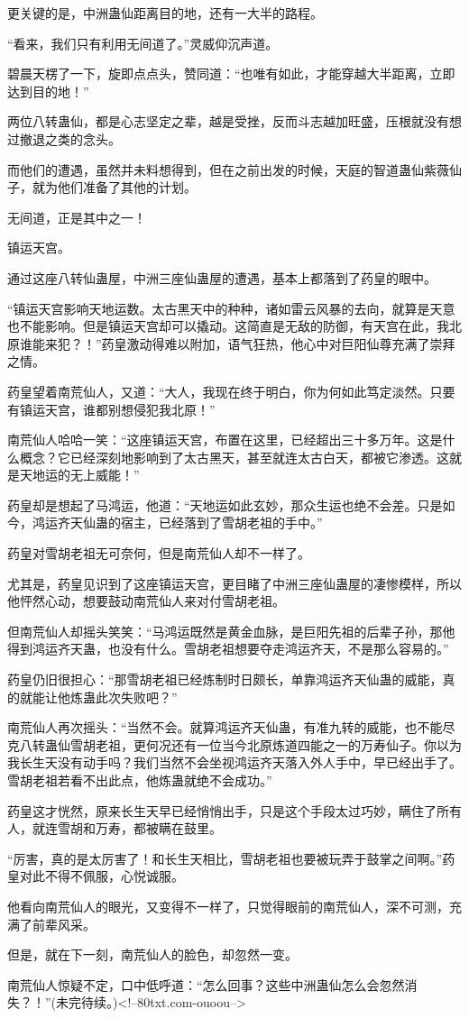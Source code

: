 \begin{this_body}
更关键的是，中洲蛊仙距离目的地，还有一大半的路程。

“看来，我们只有利用无间道了。”灵威仰沉声道。

碧晨天楞了一下，旋即点点头，赞同道：“也唯有如此，才能穿越大半距离，立即达到目的地！”

两位八转蛊仙，都是心志坚定之辈，越是受挫，反而斗志越加旺盛，压根就没有想过撤退之类的念头。

而他们的遭遇，虽然并未料想得到，但在之前出发的时候，天庭的智道蛊仙紫薇仙子，就为他们准备了其他的计划。

无间道，正是其中之一！

镇运天宫。

通过这座八转仙蛊屋，中洲三座仙蛊屋的遭遇，基本上都落到了药皇的眼中。

“镇运天宫影响天地运数。太古黑天中的种种，诸如雷云风暴的去向，就算是天意也不能影响。但是镇运天宫却可以撬动。这简直是无敌的防御，有天宫在此，我北原谁能来犯？！”药皇激动得难以附加，语气狂热，他心中对巨阳仙尊充满了崇拜之情。

药皇望着南荒仙人，又道：“大人，我现在终于明白，你为何如此笃定淡然。只要有镇运天宫，谁都别想侵犯我北原！”

南荒仙人哈哈一笑：“这座镇运天宫，布置在这里，已经超出三十多万年。这是什么概念？它已经深刻地影响到了太古黑天，甚至就连太古白天，都被它渗透。这就是天地运的无上威能！”

药皇却是想起了马鸿运，他道：“天地运如此玄妙，那众生运也绝不会差。只是如今，鸿运齐天仙蛊的宿主，已经落到了雪胡老祖的手中。”

药皇对雪胡老祖无可奈何，但是南荒仙人却不一样了。

尤其是，药皇见识到了这座镇运天宫，更目睹了中洲三座仙蛊屋的凄惨模样，所以他怦然心动，想要鼓动南荒仙人来对付雪胡老祖。

但南荒仙人却摇头笑笑：“马鸿运既然是黄金血脉，是巨阳先祖的后辈子孙，那他得到鸿运齐天蛊，也没有什么。雪胡老祖想要夺走鸿运齐天，不是那么容易的。”

药皇仍旧很担心：“那雪胡老祖已经炼制时日颇长，单靠鸿运齐天仙蛊的威能，真的就能让他炼蛊此次失败吧？”

南荒仙人再次摇头：“当然不会。就算鸿运齐天仙蛊，有准九转的威能，也不能尽克八转蛊仙雪胡老祖，更何况还有一位当今北原炼道四能之一的万寿仙子。你以为我长生天没有动手吗？我们当然不会坐视鸿运齐天落入外人手中，早已经出手了。雪胡老祖若看不出此点，他炼蛊就绝不会成功。”

药皇这才恍然，原来长生天早已经悄悄出手，只是这个手段太过巧妙，瞒住了所有人，就连雪胡和万寿，都被瞒在鼓里。

“厉害，真的是太厉害了！和长生天相比，雪胡老祖也要被玩弄于鼓掌之间啊。”药皇对此不得不佩服，心悦诚服。

他看向南荒仙人的眼光，又变得不一样了，只觉得眼前的南荒仙人，深不可测，充满了前辈风采。

但是，就在下一刻，南荒仙人的脸色，却忽然一变。

南荒仙人惊疑不定，口中低呼道：“怎么回事？这些中洲蛊仙怎么会忽然消失？！”(未完待续。)<!--80txt.com-ouoou-->

\end{this_body}

